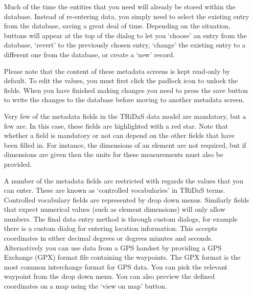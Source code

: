 Much of the time the entities that you need will already be stored within the database.  Instead of re-entering data, you simply need to select the existing entry from the database, saving a great deal of time.  Depending on the situation, buttons will appear at the top of the dialog to let you `choose' an entry from the database, `revert' to the previously chosen entry, `change' the existing entry to a different one from the database, or create a `new' record.

Please note that the content of these metadata screens is kept read-only by default.  To edit the values, you must first click the padlock icon to unlock the fields.  When you have finished making changes you need to press the save button to write the changes to the database before moving to another metadata screen.

Very few of the metadata fields in the TRiDaS data model are mandatory, but a few are.  In this case, these fields are highlighted with a red star.  Note that whether a field is mandatory or not can depend on the other fields that have been filled in.  For instance, the dimensions of an element are not required, but if dimensions are given then the units for these measurements must also be provided.

A number of the metadata fields are restricted with regards the values that you can enter.  These are known as `controlled vocabularies' in TRiDaS terms.  Controlled vocabulary fields are represented by drop down menus.  Similarly fields that expect numerical values (such as element dimensions) will only allow numbers.  The final data entry method is through custom dialogs, for example there is a custom dialog for entering location information.  This accepts coordinates in either decimal degrees or degrees minutes and seconds.  Alternatively you can use data from a GPS handset by providing a GPS Exchange (GPX) format file containing the waypoints. The GPX format is the most common interchange format for GPS data. You can pick the relevant waypoint from the drop down menu.  You can also preview the defined coordinates on a map using the `view on map' button. 



